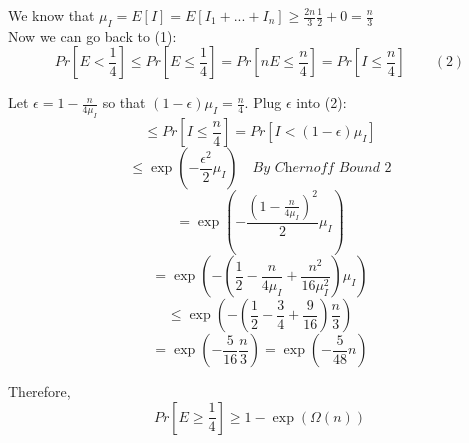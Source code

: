 \noindent We know that $\mu_{I} = E[I] = E[ I_1 + ... + I_n ] \geq \frac{2n}{3}\frac{1}{2} + 0 = \frac{n}{3}$ \\

\noindent Now we can go back to (1):
$$ Pr[ E < \frac{1}{4} ] \leq Pr[ E \leq \frac{1}{4} ] = Pr[ nE \leq \frac{n}{4} ] = Pr[ I \leq \frac{n}{4} ] \quad \quad (2) $$

\noindent Let $\epsilon = 1 - \frac{n}{4\mu_I}$ so that $(1 - \epsilon)\mu_I = \frac{n}{4}$. Plug $\epsilon$ into (2):
$$\leq Pr[ I \leq \frac{n}{4} ] = Pr[ I < (1 - \epsilon)\mu_I ]$$
$$\leq \exp(- \frac{\epsilon^2}{2} \mu_I) \quad\textit{By Chernoff Bound 2} $$
$$ = \exp(- \frac{(1 - \frac{n}{4\mu_I})^2}{2}\mu_I)$$
$$ = \exp(- (\frac{1}{2} - \frac{n}{4\mu_I} + \frac{n^2}{16\mu_{I}^2})\mu_I) $$
$$ \leq \exp(- (\frac{1}{2} - \frac{3}{4} + \frac{9}{16})\frac{n}{3}) $$
$$ = \exp(- \frac{5}{16}\frac{n}{3}) = \exp(- \frac{5}{48} n)$$

\noindent Therefore, $$ Pr[ E \geq \frac{1}{4} ] \geq 1 - \exp(\Omega(n)) $$

